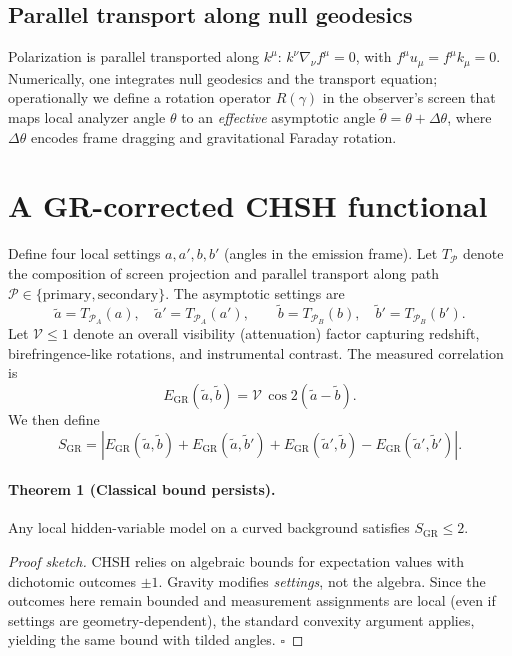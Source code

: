 \documentclass[11pt]{article}
\begin{document}
\subsection{Parallel transport along null geodesics}
Polarization is parallel transported along \(k^\mu\): \(k^\nu \nabla_\nu f^\mu=0\), with \(f^\mu u_\mu=f^\mu k_\mu=0\). Numerically, one integrates null geodesics and the transport equation; operationally we define a rotation operator \(R(\gamma)\) in the observer's screen that maps local analyzer angle \(\theta\) to an \emph{effective} asymptotic angle \(\tilde\theta=\theta+\Delta\theta\), where \(\Delta\theta\) encodes frame dragging and gravitational Faraday rotation.

\section{A GR-corrected CHSH functional}
Define four local settings \(a,a',b,b'\) (angles in the emission frame). Let \(T_{\mathcal{P}}\) denote the composition of screen projection and parallel transport along path \(\mathcal{P}\in\{\text{primary},\text{secondary}\}\). The asymptotic settings are
\begin{equation}
  \tilde a=T_{\mathcal{P}_A}(a),\quad \tilde a'=T_{\mathcal{P}_A}(a'),\qquad
  \tilde b=T_{\mathcal{P}_B}(b),\quad \tilde b'=T_{\mathcal{P}_B}(b').
\end{equation}
Let \(\mathcal{V}\le 1\) denote an overall visibility (attenuation) factor capturing redshift, birefringence-like rotations, and instrumental contrast. The measured correlation is
\begin{equation}
  E_{\mathrm{GR}}(\tilde a,\tilde b)=\mathcal{V}\,\cos 2(\tilde a-\tilde b).
\end{equation}
We then define
\begin{equation}
  S_{\mathrm{GR}}=\left|E_{\mathrm{GR}}(\tilde a,\tilde b)+E_{\mathrm{GR}}(\tilde a,\tilde b')+E_{\mathrm{GR}}(\tilde a',\tilde b)-E_{\mathrm{GR}}(\tilde a',\tilde b')\right|.
  \label{eq:sgr}
\end{equation}
\paragraph{Theorem 1 (Classical bound persists).} Any local hidden-variable model on a curved background satisfies \(S_{\mathrm{GR}}\le 2\).
\begin{proof}[Proof sketch]
CHSH relies on algebraic bounds for expectation values with dichotomic outcomes \(\pm1\). Gravity modifies \emph{settings}, not the algebra. Since the outcomes here remain bounded and measurement assignments are local (even if settings are geometry-dependent), the standard convexity argument applies, yielding the same bound with tilded angles. \(\square\)
\end{proof}
\end{document}
